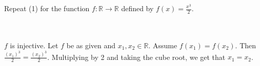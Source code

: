 Repeat (1) for the function $f:\mathbb{R}\rightarrow\mathbb{R}$ defined by $f(x)=\frac{x^3}{2}$.\\\\

\begin{solution}\renewcommand{\qedsymbol}{}\ \\
    $f$ is injective. Let $f$ be as given and $x_1,x_2\in\mathbb{R}$. Assume $f(x_1)=f(x_2)$. Then
    $\frac{(x_1)^3}{2}=\frac{(x_2)^3}{2}$. Multiplying by 2 and taking the cube root, we get that
    $x_1=x_2$.

\end{solution}